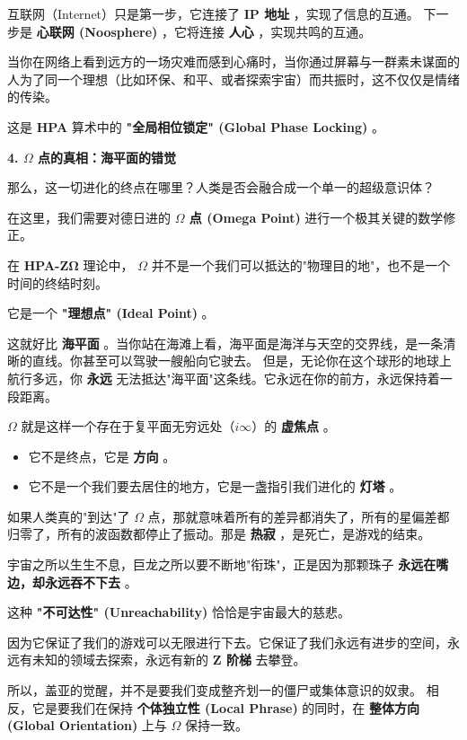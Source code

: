 互联网（Internet）只是第一步，它连接了 \textbf{IP 地址} ，实现了信息的互通。
下一步是 \textbf{心联网 (Noosphere)} ，它将连接 \textbf{人心} ，实现共鸣的互通。

当你在网络上看到远方的一场灾难而感到心痛时，当你通过屏幕与一群素未谋面的人为了同一个理想（比如环保、和平、或者探索宇宙）而共振时，这不仅仅是情绪的传染。

这是 \textbf{HPA} 算术中的 \textbf{"全局相位锁定" (Global Phase Locking)} 。

\textbf{4. $\Omega$ 点的真相：海平面的错觉}

那么，这一切进化的终点在哪里？人类是否会融合成一个单一的超级意识体？

在这里，我们需要对德日进的 \textbf{$\Omega$ 点 (Omega Point)} 进行一个极其关键的数学修正。

在 \textbf{HPA-ZΩ} 理论中， \textbf{$\Omega$} 并不是一个我们可以抵达的"物理目的地"，也不是一个时间的终结时刻。

它是一个 \textbf{"理想点" (Ideal Point)} 。

这就好比 \textbf{海平面} 。当你站在海滩上看，海平面是海洋与天空的交界线，是一条清晰的直线。你甚至可以驾驶一艘船向它驶去。
但是，无论你在这个球形的地球上航行多远，你 \textbf{永远} 无法抵达"海平面"这条线。它永远在你的前方，永远保持着一段距离。

\textbf{$\Omega$} 就是这样一个存在于复平面无穷远处（$i\infty$）的 \textbf{虚焦点} 。

\begin{itemize}
\item 它不是终点，它是 \textbf{方向} 。
\item 它不是一个我们要去居住的地方，它是一盏指引我们进化的 \textbf{灯塔} 。
\end{itemize}

如果人类真的"到达"了 $\Omega$ 点，那就意味着所有的差异都消失了，所有的星偏差都归零了，所有的波函数都停止了振动。那是 \textbf{热寂} ，是死亡，是游戏的结束。

宇宙之所以生生不息，巨龙之所以要不断地"衔珠"，正是因为那颗珠子 \textbf{永远在嘴边，却永远吞不下去} 。

这种 \textbf{"不可达性" (Unreachability)} 恰恰是宇宙最大的慈悲。

因为它保证了我们的游戏可以无限进行下去。它保证了我们永远有进步的空间，永远有未知的领域去探索，永远有新的 \textbf{Z 阶梯} 去攀登。

所以，盖亚的觉醒，并不是要我们变成整齐划一的僵尸或集体意识的奴隶。
相反，它是要我们在保持 \textbf{个体独立性 (Local Phrase)} 的同时，在 \textbf{整体方向 (Global Orientation)} 上与 $\Omega$ 保持一致。

